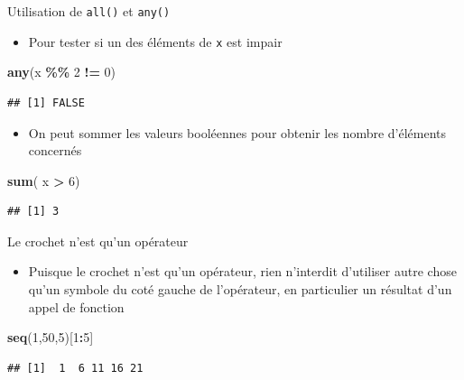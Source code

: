 \documentclass[
  ignorenonframetext,
]{beamer}
\newenvironment{Shaded}{\begin{snugshade}}{\end{snugshade}}
\newcommand{\DecValTok}[1]{\textcolor[rgb]{0.00,0.00,0.81}{#1}}
\newcommand{\FunctionTok}[1]{\textcolor[rgb]{0.13,0.29,0.53}{\textbf{#1}}}
\newcommand{\NormalTok}[1]{#1}
\newcommand{\SpecialCharTok}[1]{\textcolor[rgb]{0.81,0.36,0.00}{\textbf{#1}}}
\providecommand{\tightlist}{%
  \setlength{\itemsep}{0pt}\setlength{\parskip}{0pt}}
\begin{document}
\begin{frame}[fragile]{Utilisation de \texttt{all()} et \texttt{any()}}
\protect\hypertarget{utilisation-de-all-et-any-1}{}
\begin{itemize}
\tightlist
\item
  Pour tester si un des éléments de \texttt{x} est impair
\end{itemize}

\tiny

\begin{Shaded}
\begin{Highlighting}[]
\FunctionTok{any}\NormalTok{(x }\SpecialCharTok{\%\%} \DecValTok{2} \SpecialCharTok{!=} \DecValTok{0}\NormalTok{)}
\end{Highlighting}
\end{Shaded}

\begin{verbatim}
## [1] FALSE
\end{verbatim}

\normalsize

\begin{itemize}
\tightlist
\item
  On peut sommer les valeurs booléennes pour obtenir les nombre
  d'éléments concernés
\end{itemize}

\tiny

\begin{Shaded}
\begin{Highlighting}[]
\FunctionTok{sum}\NormalTok{( x }\SpecialCharTok{\textgreater{}} \DecValTok{6}\NormalTok{)}
\end{Highlighting}
\end{Shaded}

\begin{verbatim}
## [1] 3
\end{verbatim}

\normalsize
\end{frame}

\begin{frame}[fragile]{Le crochet n'est qu'un opérateur}
\protect\hypertarget{le-crochet-nest-quun-opuxe9rateur}{}
\begin{itemize}
\tightlist
\item
  Puisque le crochet n'est qu'un opérateur, rien n'interdit d'utiliser
  autre chose qu'un symbole du coté gauche de l'opérateur, en
  particulier un résultat d'un appel de fonction
\end{itemize}

\tiny

\begin{Shaded}
\begin{Highlighting}[]
\FunctionTok{seq}\NormalTok{(}\DecValTok{1}\NormalTok{,}\DecValTok{50}\NormalTok{,}\DecValTok{5}\NormalTok{)[}\DecValTok{1}\SpecialCharTok{:}\DecValTok{5}\NormalTok{]}
\end{Highlighting}
\end{Shaded}

\begin{verbatim}
## [1]  1  6 11 16 21
\end{verbatim}

\normalsize
\end{frame}
\end{document}
